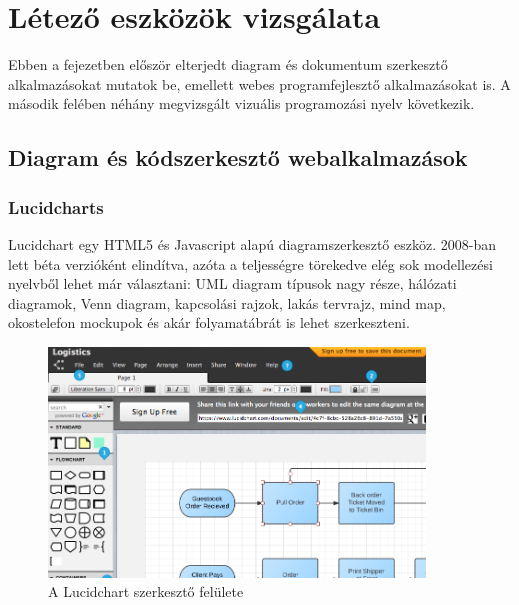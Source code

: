 \chapter{Létező eszközök vizsgálata}


Ebben a fejezetben először elterjedt diagram és dokumentum szerkesztő alkalmazásokat mutatok be, emellett webes programfejlesztő alkalmazásokat is. A második felében néhány megvizsgált vizuális programozási nyelv következik.

\section{Diagram és kódszerkesztő webalkalmazások}

\subsection{Lucidcharts}

Lucidchart egy HTML5 és Javascript alapú diagramszerkesztő eszköz.  2008-ban lett béta verzióként elindítva\cite{lucidref}, azóta a teljességre törekedve elég sok modellezési nyelvből lehet már választani: UML diagram típusok nagy része, hálózati diagramok, Venn diagram, kapcsolási rajzok, lakás tervrajz, mind map, okostelefon mockupok és akár folyamatábrát is lehet szerkeszteni.


\begin{figure}[!ht]
\centering
\includegraphics[width=10cm,keepaspectratio]{figures/lucid.png}
\caption{A Lucidchart szerkesztő felülete}
\label{fig:lucideditor}
\end{figure}

